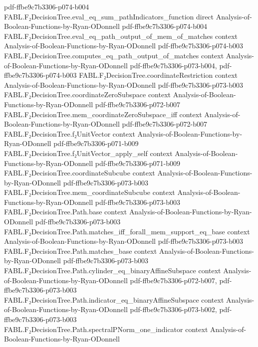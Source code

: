 \begin{theorem}
  {pdf-ffbe9c7b3306-p074-b004}
\proofstep
  {FABL.F₂DecisionTree.eval_eq_sum_pathIndicators_function}
  {direct}
  {Analysis-of-Boolean-Functions-by-Ryan-ODonnell}
  {pdf-ffbe9c7b3306-p074-b004}
\proofstep
  {FABL.F₂DecisionTree.eval_eq_path_output_of_mem_of_matches}
  {context}
  {Analysis-of-Boolean-Functions-by-Ryan-ODonnell}
  {pdf-ffbe9c7b3306-p074-b003}
\proofstep
  {FABL.F₂DecisionTree.computes_eq_path_output_of_matches}
  {context}
  {Analysis-of-Boolean-Functions-by-Ryan-ODonnell}
  {pdf-ffbe9c7b3306-p073-b004,
    pdf-ffbe9c7b3306-p074-b003}
\proofstep
  {FABL.F₂DecisionTree.coordinateRestriction}
  {context}
  {Analysis-of-Boolean-Functions-by-Ryan-ODonnell}
  {pdf-ffbe9c7b3306-p073-b003}
\proofstep
  {FABL.F₂DecisionTree.coordinateZeroSubspace}
  {context}
  {Analysis-of-Boolean-Functions-by-Ryan-ODonnell}
  {pdf-ffbe9c7b3306-p072-b007}
\proofstep
  {FABL.F₂DecisionTree.mem_coordinateZeroSubspace_iff}
  {context}
  {Analysis-of-Boolean-Functions-by-Ryan-ODonnell}
  {pdf-ffbe9c7b3306-p072-b007}
\proofstep
  {FABL.F₂DecisionTree.f₂UnitVector}
  {context}
  {Analysis-of-Boolean-Functions-by-Ryan-ODonnell}
  {pdf-ffbe9c7b3306-p071-b009}
\proofstep
  {FABL.F₂DecisionTree.f₂UnitVector_apply_self}
  {context}
  {Analysis-of-Boolean-Functions-by-Ryan-ODonnell}
  {pdf-ffbe9c7b3306-p071-b009}
\proofstep
  {FABL.F₂DecisionTree.coordinateSubcube}
  {context}
  {Analysis-of-Boolean-Functions-by-Ryan-ODonnell}
  {pdf-ffbe9c7b3306-p073-b003}
\proofstep
  {FABL.F₂DecisionTree.mem_coordinateSubcube}
  {context}
  {Analysis-of-Boolean-Functions-by-Ryan-ODonnell}
  {pdf-ffbe9c7b3306-p073-b003}
\proofstep
  {FABL.F₂DecisionTree.Path.base}
  {context}
  {Analysis-of-Boolean-Functions-by-Ryan-ODonnell}
  {pdf-ffbe9c7b3306-p073-b003}
\proofstep
  {FABL.F₂DecisionTree.Path.matches_iff_forall_mem_support_eq_base}
  {context}
  {Analysis-of-Boolean-Functions-by-Ryan-ODonnell}
  {pdf-ffbe9c7b3306-p073-b003}
\proofstep
  {FABL.F₂DecisionTree.Path.matches_base}
  {context}
  {Analysis-of-Boolean-Functions-by-Ryan-ODonnell}
  {pdf-ffbe9c7b3306-p073-b003}
\proofstep
  {FABL.F₂DecisionTree.Path.cylinder_eq_binaryAffineSubspace}
  {context}
  {Analysis-of-Boolean-Functions-by-Ryan-ODonnell}
  {pdf-ffbe9c7b3306-p072-b007,
    pdf-ffbe9c7b3306-p073-b003}
\proofstep
  {FABL.F₂DecisionTree.Path.indicator_eq_binaryAffineSubspace}
  {context}
  {Analysis-of-Boolean-Functions-by-Ryan-ODonnell}
  {pdf-ffbe9c7b3306-p073-b002,
    pdf-ffbe9c7b3306-p073-b003}
\proofstep
  {FABL.F₂DecisionTree.Path.spectralPNorm_one_indicator}
  {context}
  {Analysis-of-Boolean-Functions-by-Ryan-ODonnell}

\end{theorem}
